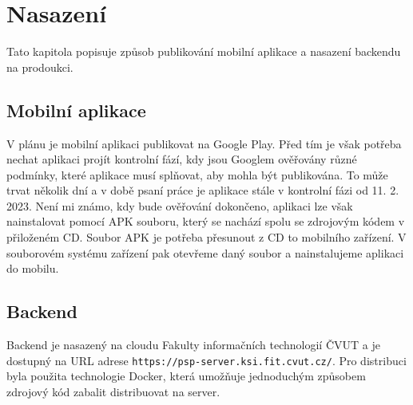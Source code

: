 \chapter{Nasazení}
\label{ch:deploy}

\begin{chapterabstract}
	Tato kapitola popisuje způsob publikování mobilní aplikace a nasazení backendu na prodoukci.
\end{chapterabstract}

\section{Mobilní aplikace}
V plánu je mobilní aplikaci publikovat na Google Play. Před tím je však potřeba nechat aplikaci projít kontrolní fází, kdy jsou Googlem ověřovány různé podmínky, které aplikace musí splňovat, aby mohla být publikována. To může trvat několik dní a v době psaní práce je aplikace stále v kontrolní fázi od 11. 2. 2023. Není mi známo, kdy bude ověřování dokončeno, aplikaci lze však nainstalovat pomocí APK souboru, který se nachází spolu se zdrojovým kódem v přiloženém CD. Soubor APK je potřeba přesunout z CD to mobilního zařízení. V souborovém systému zařízení pak otevřeme daný soubor a nainstalujeme aplikaci do mobilu.

\section{Backend}
Backend je nasazený na cloudu Fakulty informačních technologií ČVUT a je dostupný na URL adrese \texttt{https://psp-server.ksi.fit.cvut.cz/}. Pro distribuci byla použita technologie Docker, která umožňuje jednoduchým způsobem zdrojový kód zabalit distribuovat na server.